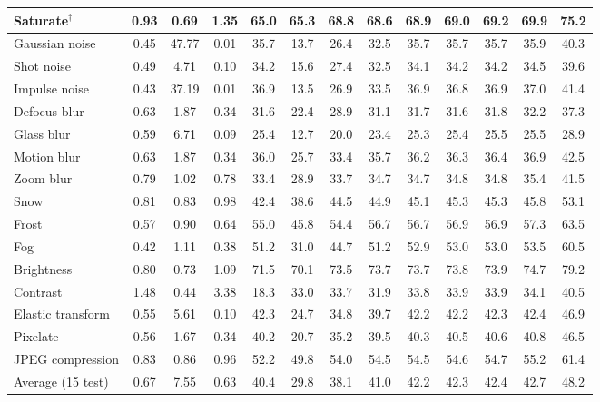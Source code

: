 \begin{table}[t]
\begin{tabular}{l|ccc|cc|cc|ccccc}
        Saturate$^\dagger$ & 0.93 & 0.69 & 1.35 & 65.0 & 65.3 & 68.8 & 68.6 & 68.9 & 69.0 & 69.2 & 69.9 & 75.2 \\
        \midrule
        Gaussian noise & 0.45 & 47.77 & 0.01 & 35.7 & 13.7 & 26.4 & 32.5 & 35.7 & 35.7 & 35.7 & 35.9 & 40.3 \\
        Shot noise & 0.49 & 4.71 & 0.10 & 34.2 & 15.6 & 27.4 & 32.5 & 34.1 & 34.2 & 34.2 & 34.5 & 39.6 \\
        Impulse noise & 0.43 & 37.19 & 0.01 & 36.9 & 13.5 & 26.9 & 33.5 & 36.9 & 36.8 & 36.9 & 37.0 & 41.4 \\
        Defocus blur & 0.63 & 1.87 & 0.34 & 31.6 & 22.4 & 28.9 & 31.1 & 31.7 & 31.6 & 31.8 & 32.2 & 37.3 \\
        Glass blur & 0.59 & 6.71 & 0.09 & 25.4 & 12.7 & 20.0 & 23.4 & 25.3 & 25.4 & 25.5 & 25.5 & 28.9 \\
        Motion blur & 0.63 & 1.87 & 0.34 & 36.0 & 25.7 & 33.4 & 35.7 & 36.2 & 36.3 & 36.4 & 36.9 & 42.5 \\
        Zoom blur & 0.79 & 1.02 & 0.78 & 33.4 & 28.9 & 33.7 & 34.7 & 34.7 & 34.8 & 34.8 & 35.4 & 41.5 \\
        Snow & 0.81 & 0.83 & 0.98 & 42.4 & 38.6 & 44.5 & 44.9 & 45.1 & 45.3 & 45.3 & 45.8 & 53.1 \\
        Frost & 0.57 & 0.90 & 0.64 & 55.0 & 45.8 & 54.4 & 56.7 & 56.7 & 56.9 & 56.9 & 57.3 & 63.5 \\
        Fog & 0.42 & 1.11 & 0.38 & 51.2 & 31.0 & 44.7 & 51.2 & 52.9 & 53.0 & 53.0 & 53.5 & 60.5 \\
        Brightness & 0.80 & 0.73 & 1.09 & 71.5 & 70.1 & 73.5 & 73.7 & 73.7 & 73.8 & 73.9 & 74.7 & 79.2 \\
        Contrast & 1.48 & 0.44 & 3.38 & 18.3 & 33.0 & 33.7 & 31.9 & 33.8 & 33.9 & 33.9 & 34.1 & 40.5 \\
        Elastic transform & 0.55 & 5.61 & 0.10 & 42.3 & 24.7 & 34.8 & 39.7 & 42.2 & 42.2 & 42.3 & 42.4 & 46.9 \\
        Pixelate & 0.56 & 1.67 & 0.34 & 40.2 & 20.7 & 35.2 & 39.5 & 40.3 & 40.5 & 40.6 & 40.8 & 46.5 \\
        JPEG compression & 0.83 & 0.86 & 0.96 & 52.2 & 49.8 & 54.0 & 54.5 & 54.5 & 54.6 & 54.7 & 55.2 & 61.4 \\
        \midrule
        Average (15 test) & 0.67 & 7.55 & 0.63 & 40.4 & 29.8 & 38.1 & 41.0 & 42.2 & 42.3 & 42.4 & 42.7 & 48.2 \\
        \bottomrule
    \end{tabular}
\end{table}
